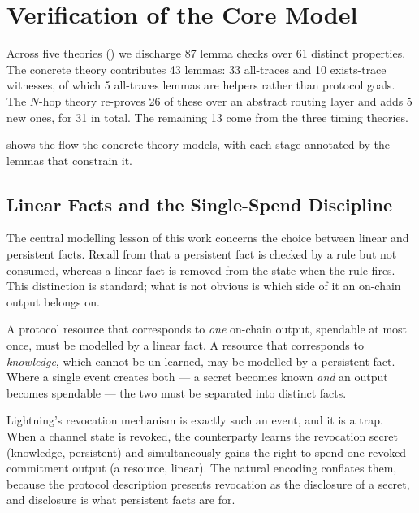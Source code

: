 \section{Verification of the Core Model}
\label{sec:verification}

Across five theories () we discharge 87 lemma checks over 61
distinct properties. The concrete theory  contributes 43
lemmas: 33 all-traces and 10 exists-trace witnesses, of which 5 all-traces
lemmas are \code{[reuse]} helpers rather than protocol goals. The $N$-hop
theory  re-proves 26 of these over an abstract routing layer
and adds 5 new ones, for 31 in total. The remaining 13 come from the three
timing theories.

 shows the flow the concrete theory models, with each stage
annotated by the lemmas that constrain it.



\subsection{Linear Facts and the Single-Spend Discipline}
\label{sec:discipline}

The central modelling lesson of this work concerns the choice between linear
and persistent facts. Recall from  that a persistent fact
 is checked by a rule but not consumed, whereas a linear fact
 is removed from the state when the rule fires. This distinction is
standard; what is not obvious is which side of it an on-chain output belongs
on.

\begin{defn}
\label{def:singlespend}
A protocol resource that corresponds to \emph{one} on-chain output, spendable
at most once, must be modelled by a linear fact. A resource that corresponds to
\emph{knowledge}, which cannot be un-learned, may be modelled by a persistent
fact. Where a single event creates both --- a secret becomes known \emph{and}
an output becomes spendable --- the two must be separated into distinct facts.
\end{defn}

Lightning's revocation mechanism is exactly such an event, and it is a trap.
When a channel state is revoked, the counterparty learns the revocation secret
(knowledge, persistent) and simultaneously gains the right to spend one revoked
commitment output (a resource, linear). The natural encoding conflates them,
because the protocol description presents revocation as the disclosure of a
secret, and disclosure is what persistent facts are for.

